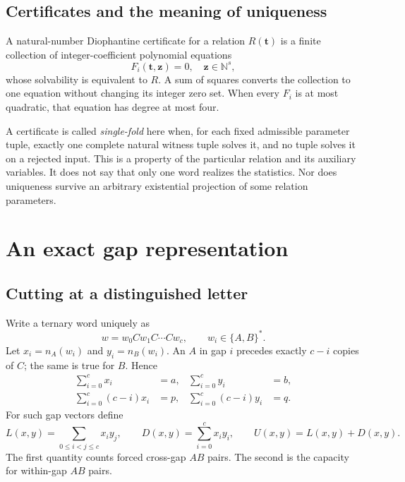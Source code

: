 \documentclass[11pt,letterpaper]{article}
\theoremstyle{definition}
\theoremstyle{remark}
\newcommand{\N}{\mathbb N}
\begin{document}
\subsection{Certificates and the meaning of uniqueness}
A natural-number Diophantine certificate for a relation $R(\boldsymbol t)$ is a finite collection of integer-coefficient polynomial equations
\[
 F_i(\boldsymbol t,\boldsymbol z)=0,\quad
 \boldsymbol z\in\N^s,
\]
whose solvability is equivalent to $R$. A sum of squares converts the collection to one equation without changing its integer zero set. When every $F_i$ is at most quadratic, that equation has degree at most four.

A certificate is called \emph{single-fold} here when, for each fixed admissible parameter tuple, exactly one complete natural witness tuple solves it, and no tuple solves it on a rejected input. This is a property of the particular relation and its auxiliary variables. It does not say that only one word realizes the statistics. Nor does uniqueness survive an arbitrary existential projection of some relation parameters.

\section{An exact gap representation}
\subsection{Cutting at a distinguished letter}
Write a ternary word uniquely as
\begin{equation}\label{gts:po:eq:gaps}
 w=w_0Cw_1C\cdots Cw_c,
 \qquad w_i\in\{A,B\}^{*}.
\end{equation}
Let $x_i=n_A(w_i)$ and $y_i=n_B(w_i)$. An $A$ in gap $i$ precedes exactly $c-i$ copies of $C$; the same is true for $B$. Hence
\begin{align}
 \sum_{i=0}^c x_i&=a,& \sum_{i=0}^c y_i&=b,\label{gts:po:eq:totals}\\
 \sum_{i=0}^c(c-i)x_i&=p,&
 \sum_{i=0}^c(c-i)y_i&=q.\label{gts:po:eq:moments}
\end{align}
For such gap vectors define
\begin{equation}\label{gts:po:eq:LD}
 L(x,y)=\sum_{0\le i<j\le c}x_i y_j,
 \qquad D(x,y)=\sum_{i=0}^c x_i y_i,
 \qquad U(x,y)=L(x,y)+D(x,y).
\end{equation}
The first quantity counts forced cross-gap $AB$ pairs. The second is the capacity for within-gap $AB$ pairs.
\end{document}
